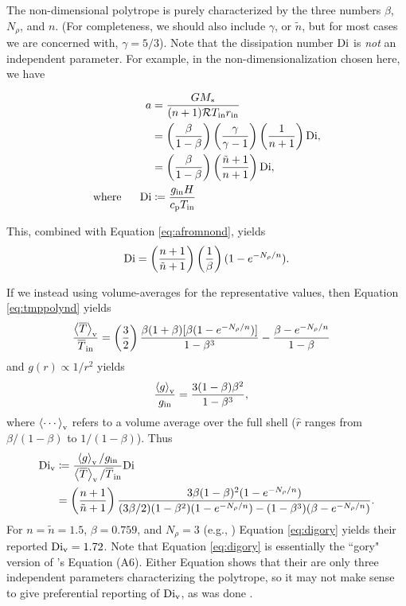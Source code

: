 \documentclass[12pt]{article}
\numberwithin{equation}{section}
\newcommand{\nrho}{N_\rho}
\begin{document}
The non-dimensional polytrope is purely characterized by the three numbers $\beta$, $\nrho$, and $n$. (For completeness, we should also include $\gamma$, or $\tilde{n}$, but for most cases we are concerned with, $\gamma=5/3$). Note that the dissipation number ${\rm{Di}}$ is \textit{not} an independent parameter. For example, in the non-dimensionalization chosen here, we have

\begin{align*}
	a &= \frac{GM_*}{(n+1)\mathcal{R} T_{\rm{in}} r_{\rm{in}}} \\
	&= \left(\frac{\beta}{1-\beta}\right) \left(\frac{\gamma}{\gamma - 1}\right)  \left( \frac{1}{n+1} \right) {\rm{Di}},\\
	&= \left(\frac{\beta}{1-\beta}\right) \left( \frac{\tilde{n}+1}{n+1} \right) {\rm{Di}}, \\
	\text{where}\ \ \ \ \  {\rm{Di}} &\coloneqq \frac{g_{\rm{in}} H}{c_{\rm{p}} T_{\rm{in}}}
\end{align*}

This, combined with Equation \eqref{eq:afromnond}, yields
\begin{align}
	\di = \left(\frac{n+1}{\tilde{n}+1}\right)  \left(\frac{1}{\beta} \right) (1 - e^{-\nrho/n}).
\end{align}

If we instead using volume-averages for the representative values, then Equation \eqref{eq:tmppolynd} yields
\begin{align*}
	\frac{\avvol{\tmpref}}{\tmpref\inn} &= \left(\frac{3}{2}\right) \frac{\beta(1+\beta)[\beta(1-e^{-\nrho/n})]} {1-\beta^3} - \frac{\beta-e^{-\nrho/n}}{1-\beta}
\end{align*}
and $g(r)\propto 1/r^2$ yields
\begin{align*}
	\frac{\left\langle g\right\rangle_{\rm{v}}}{g_{\rm{in}}} &= \frac{3(1-\beta)\beta^2}{1-\beta^3},
\end{align*}
where $\left\langle\cdots\right\rangle_{\rm{v}}$ refers to a volume average over the full shell ($\hat{r}$ ranges from $\beta/(1-\beta)$ to $1/(1-\beta)$). Thus
\begin{align}\label{eq:digory}
	\di_{\rm{v}} &\define \frac{\avvol{g}/g\inn}{\avvol{\tmpref}/\tmpref\inn}\di \nonumber\\
	&= \left(\frac{n+1}{\tilde{n}+1}\right)   \frac{3 \beta (1 - \beta)^2 (1 - e^{-\nrho/n})} 
	 { (3\beta/2) (1 - \beta^2) (1 - e^{-\nrho/n}) - (1-\beta^3)(\beta-e^{-\nrho/n})}. 
\end{align}
For $n=\tilde{n}=1.5$, $\beta=0.759$, and $\nrho=3$ (e.g., \citealt{Hindman2020, Matilsky2022}) Equation \eqref{eq:digory} yields their reported ${\rm{Di}}_{\rm{v}}=1.72$. Note that Equation \eqref{eq:digory} is essentially the ``gory" version of \citealt{Hindman2020}'s Equation (A6). Either Equation shows that their are only three independent parameters characterizing the polytrope, so it may not make sense to give preferential reporting of ${\rm{Di}}_{\rm{v}}$, as was done \citet{Hindman2020,Matilsky2022}. 
\end{document}
